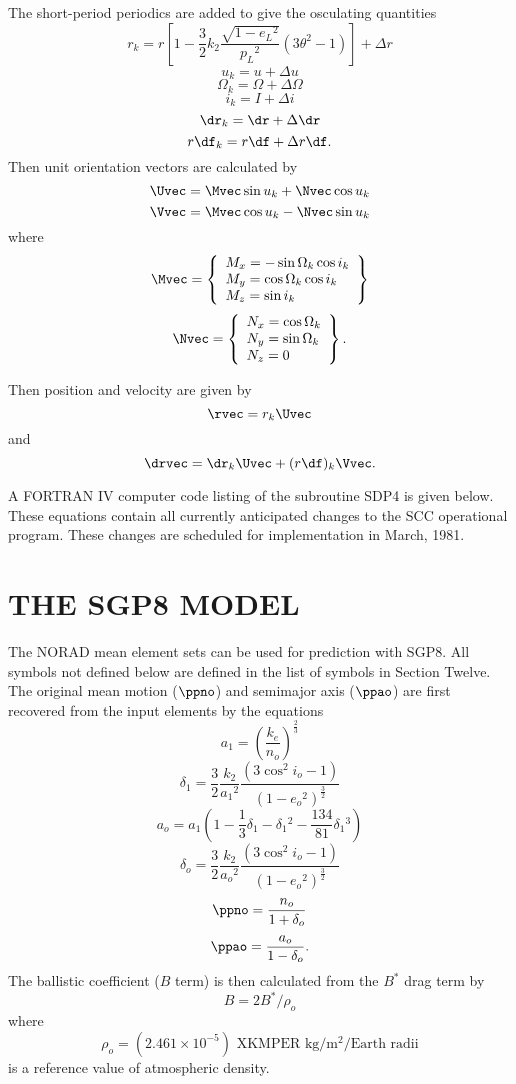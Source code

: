 The short-period periodics are added to give the osculating quantities
\[r_k=r\left[1-\dfrac32k_2\dfrac{\sqrt{1-e_L{}^2}}{p_L{}^2}(3\theta^2-1)\right]
+\Delta r\]
\[u_k=u+\Delta u\]
\[\Omega_k=\Omega+\Delta\Omega\]
\[i_k=I+\Delta i\]
\[\dr_k=\dr+\Delta\dr\]
\[r\df_k=r\df+\Delta r\df.\]
Then unit orientation vectors are calculated by
\[\Uvec=\Mvec\sin u_k+\Nvec\cos u_k\]
\[\Vvec=\Mvec\cos u_k-\Nvec\sin u_k\]
where
\[\Mvec=\left\{\begin{array}{l}
                          M_x=-\sin\Omega_k\cos i_k\\
                          M_y=\cos\Omega_k\cos i_k\\
                          M_z=\sin i_k
                         \end{array}\right\}\]
\[\Nvec=\left\{\begin{array}{l}
                          N_x=\cos\Omega_k\\
                          N_y=\sin\Omega_k\\
                          N_z=0
                         \end{array}\right\}.\]

Then position and velocity are given by
\[\rvec=r_k\Uvec\]
and
\[\drvec=\dr_k\Uvec+(r\df)_k\Vvec.\]

A FORTRAN IV computer code listing of the subroutine SDP4 is given below.
These equations contain all currently anticipated changes to the SCC
operational program.  These changes are scheduled for implementation in March,
1981.
\newpage

\newpage
\section[The SGP8 Model]{THE SGP8 MODEL}
The NORAD mean element sets can be used for prediction with SGP8.  All symbols
not defined below are defined in the list of symbols in Section Twelve.  The
original mean motion ($\ppno$) and semimajor axis ($\ppao$) are first
recovered from the input elements by the equations
\[a_1=\left(\dfrac{k_e}{n_o}\right)^{\frac23}\]
\[\delta_1=\frac32\frac{k_2}{a_1{}^2}\frac{(3\cos^2i_o-1)}
{(1-e_o{}^2)^\frac32}\]
\[a_o=a_1\left(1-\dfrac13\delta_1-\delta_1{}^2
-\dfrac{134}{81}\delta_1{}^3\right)\]
\[\delta_o=\dfrac32\dfrac{k_2}{a_o{}^2}\dfrac{(3\cos^2i_o-1)}
{(1-e_o{}^2)^{\frac32}}\]
\[\ppno =\dfrac{n_o}{1+\delta_o}\]
\[\ppao=\dfrac{a_o}{1-\delta_o}.\]
The ballistic coefficient ($B$ term) is then calculated from the $B^*$ drag
term by
\[B=2B^*/\rho_o\]
where
\[\rho_o=(2.461\times 10^{-5})\mbox{ XKMPER kg/m$^2$/Earth radii}\]
is a reference value of atmospheric density.

